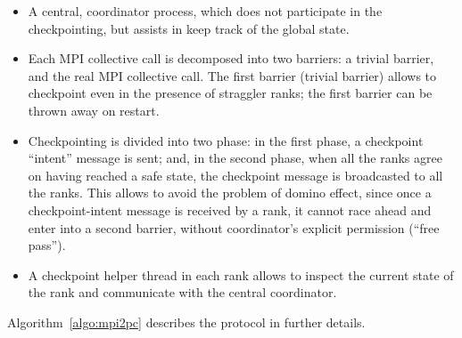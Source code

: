 \documentclass[11pt,letter]{article}
\begin{document}
\begin{itemize}
  \item A central, coordinator process, which does not participate in the
        checkpointing, but assists in keep track of the global state.

  \item Each MPI collective call is decomposed into two barriers: a trivial
         barrier, and the real MPI collective call. The first barrier (trivial
         barrier) allows \mpiSol{} to checkpoint even in the presence of
         straggler ranks; the first barrier can be thrown away on restart.

  \item Checkpointing is divided into two phase: in the first phase, a
        checkpoint ``intent'' message is sent; and, in the second phase, when
        all the ranks agree on having reached a safe state, the checkpoint
        message is broadcasted to all the ranks. This allows \mpiSol{} to
        avoid the problem of domino effect, since once a checkpoint-intent
        message is received by a rank, it cannot race ahead and enter into a
        second barrier, without coordinator's explicit permission (``free
        pass'').

  \item A checkpoint helper thread in each rank allows \mpiSol{} to inspect the
        current state of the rank and communicate with the central coordinator.
\end{itemize}

Algorithm~\ref{algo:mpi2pc} describes the protocol in further details.
\end{document}
